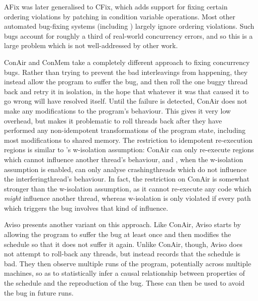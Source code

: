 AFix was later generalised to CFix\cite{Jin2012}, which adds support
for fixing certain ordering violations by patching in condition
variable operations.  Most other automated bug-fixing systems
(including {\technique}) largely ignore ordering violations.  Such
bugs account for roughly a third of real-world concurrency
errors\cite{Lu2008}, and so this is a large problem which is not
well-addressed by other work.  

ConAir\cite{Zhang2013} and ConMem\cite{Zhang2010} take a completely
different approach to fixing concurrency bugs.  Rather than trying to
prevent the bad interleavings from happening, they instead allow the
program to suffer the bug, and then roll the one buggy thread back and
retry it in isolation, in the hope that whatever it was that caused it
to go wrong will have resolved itself.  Until the failure is detected,
ConAir does not make any modifications to the program's behaviour.
This gives it very low overhead, but makes it problematic to roll
threads back after they have performed any non-idempotent
transformations of the program state, including most modifications to
shared memory.  The restriction to idempotent re-execution regions is
similar to {\technique}'s \gls{w-isolation} assumption: ConAir can
only re-execute regions which cannot influence another thread's
behaviour, and {\technique}, when the \gls{w-isolation} assumption is
enabled, can only analyse \glspl{crashingthread} which do not
influence the \gls{interferingthread}'s behaviour.  In fact, the
restriction on ConAir is somewhat stronger than the \gls{w-isolation}
assumption, as it cannot re-execute any code which \emph{might}
influence another thread, whereas \gls{w-isolation} is only violated
if every path which triggers the bug involves that kind of influence.

Aviso\cite{Lucia2013} presents another variant on this approach.  Like
ConAir, Aviso starts by allowing the program to suffer the bug at
least once and then modifies the schedule so that it does not suffer
it again.  Unlike ConAir, though, Aviso does not attempt to roll-back
any threads, but instead records that the schedule is bad.  They then
observe multiple runs of the program, potentially across multiple
machines, so as to statistically infer a causal relationship between
properties of the schedule and the reproduction of the bug.  These can
then be used to avoid the bug in future runs. 

